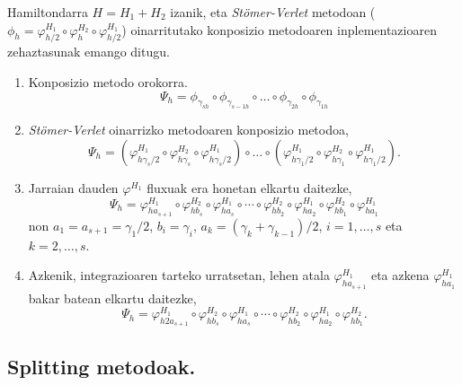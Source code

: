 Hamiltondarra $H=H_1+H_2$ izanik, eta \emph{Stömer-Verlet} metodoan ($\phi_h=\varphi_{h/2}^{H_1} \circ \varphi_{h}^{H_2} \circ \varphi_{h/2}^{H_1}$) oinarritutako konposizio metodoaren inplementazioaren zehaztasunak emango ditugu.
\begin{enumerate}
\item Konposizio metodo orokorra.
\begin{equation*}
\Psi_h =\phi_{\gamma_{s h}} \circ \phi_{\gamma_{s-1 h}} \circ \dots \circ \phi_{\gamma_{2 h}} \circ \phi_{\gamma_{1 h}}
\end{equation*}

\item \emph{Stömer-Verlet} oinarrizko metodoaren konposizio metodoa,
\begin{equation*}
\Psi_h =(\varphi_{h \gamma_s/2}^{H_1} \circ \varphi_{h \gamma_s}^{H_2} \circ \varphi_{h \gamma_s/2}^{H_1}) \circ \dots 
       \circ
       (\varphi_{h \gamma_1/2}^{H_1} \circ \varphi_{h \gamma_1}^{H_2} \circ \varphi_{h \gamma_1/2}^{H_1}).  
\end{equation*}

\item Jarraian dauden $\varphi^{H_1}$ fluxuak era honetan elkartu daitezke,
\begin{equation*}
\Psi_h=\varphi_{h a_{s+1}}^{H_1} \circ \varphi_{h b_s}^{H_2} \circ \varphi_{h a_s}^{H_1} \circ \cdots 
       \circ
       \varphi_{h b_2}^{H_2} 
       \circ
       \varphi_{h a_2}^{H_1} \circ \varphi_{h b_1}^{H_2} \circ \varphi_{h a_1}^{H_1}  
\end{equation*}
non $a_1=a_{s+1}=\gamma_1/2$, $b_i=\gamma_i$, $a_k=(\gamma_k+\gamma_{k-1})/2$, $i=1,\dots,s$ eta $k=2,\dots,s$.

\item Azkenik, integrazioaren tarteko urratsetan, lehen atala $\varphi_{h a_{s+1}}^{H_1}$ eta azkena $\varphi_{h a_1}^{H_1}$ bakar batean elkartu daitezke,
\begin{equation*}
\Psi_h=\varphi_{h 2 a_{s+1}}^{H_1} \circ \varphi_{h b_s}^{H_2} \circ \varphi_{h a_s}^{H_1} \circ \cdots 
\circ \varphi_{h b_2}^{H_2} 
\circ
\varphi_{h a_2}^{H_1} \circ \varphi_{h b_1}^{H_2}.
\end{equation*}

\end{enumerate}


\subsection{Splitting metodoak.}

